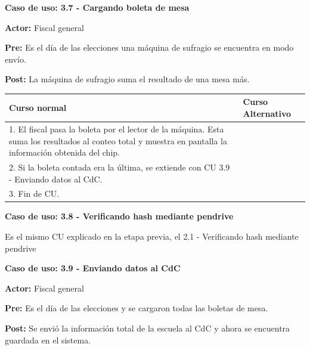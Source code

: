 \textbf{Caso de uso: 3.7 - Cargando boleta de mesa}

\textbf{Actor:} Fiscal general

\textbf{Pre:} Es el día de las elecciones una máquina de sufragio se encuentra en modo envío.

\textbf{Post:} La máquina de sufragio suma el resultado de una mesa más.

\begin{table}[h!]
	
 \begin{tabular}{|p{7.5cm} | p{7.5cm}|} 
 \hline
 \textbf{Curso normal} & \textbf{Curso Alternativo} \\
 \hline

1. El fiscal pasa la boleta por el lector de la máquina. Esta suma los resultados al conteo total y muestra en pantalla la información obtenida del chip. & \\
\hline

2. Si la boleta contada era la última, se extiende con CU 3.9 - Enviando datos al CdC. & \\
\hline

3. Fin de CU. & \\
\hline
\end{tabular}
\end{table}


\textbf{Caso de uso: 3.8 - Verificando hash mediante pendrive}


Es el mismo CU explicado en la etapa previa, el 2.1 - Verificando hash mediante pendrive


\textbf{Caso de uso: 3.9 - Enviando datos al CdC}

\textbf{Actor: }Fiscal general

\textbf{Pre:} Es el día de las elecciones y se cargaron todas las boletas de mesa.

\textbf{Post:} Se envió la información total de la escuela al CdC y ahora se encuentra guardada en el sistema.

\newpage

